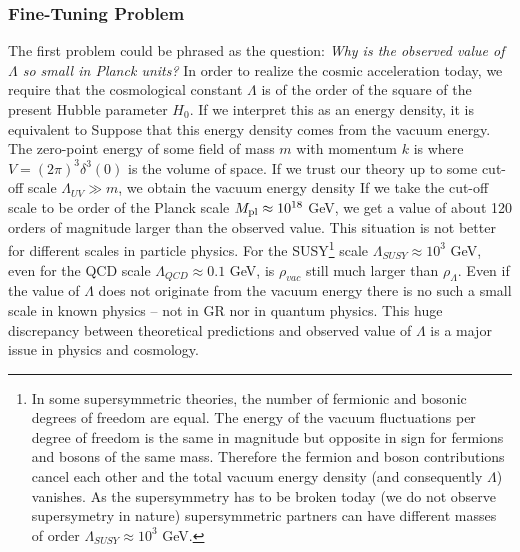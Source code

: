 \subsubsection{Fine-Tuning Problem}
The first problem could be phrased as the question: \textit{Why is the observed value of $\Lambda$ so small in Planck units?} In order to realize the cosmic acceleration today, we require that the cosmological constant $\Lambda$ is of the order of the square of the present Hubble parameter $H_0$. If we interpret this as an energy density, it is equivalent to
Suppose that this energy density comes from the vacuum energy. The zero-point energy of some field of mass $m$ with momentum $k$ is
where $V=(2\pi)^3\delta^3(0)$ is the volume of space. If we trust our theory up to some cut-off scale $\Lambda_{UV}\gg m$, we obtain the vacuum energy density
If we take the cut-off scale to be order of the Planck scale $M_{\text{\scriptsize pl}}\approx10^{18}$ GeV, we get a value of about 120 orders of magnitude larger than the observed value. This situation is not better for different scales in particle physics. For the SUSY\footnote{In some supersymmetric theories, the number of fermionic and bosonic degrees of freedom are equal. The energy of the vacuum fluctuations per degree of freedom is the same in magnitude but opposite in sign for fermions and bosons of the same mass. Therefore the fermion and boson contributions cancel each other and the total vacuum energy density (and consequently $\Lambda$) vanishes. As the supersymmetry has to be broken today (we do not observe supersymetry in nature) supersymmetric partners can have different masses of order $\Lambda_{SUSY}\approx10^{3}$ GeV.} scale $\Lambda_{SUSY}\approx10^{3}$ GeV, even for the QCD scale $\Lambda_{QCD}\approx0.1$ GeV, is $\rho_{vac}$ still much larger than $\rho_\Lambda$. Even if the value of $\Lambda$ does not originate from the vacuum energy there is no such a small scale in known physics -- not in GR nor in quantum physics. This huge discrepancy between theoretical predictions and observed value of $\Lambda$ is a major issue in physics and cosmology.
